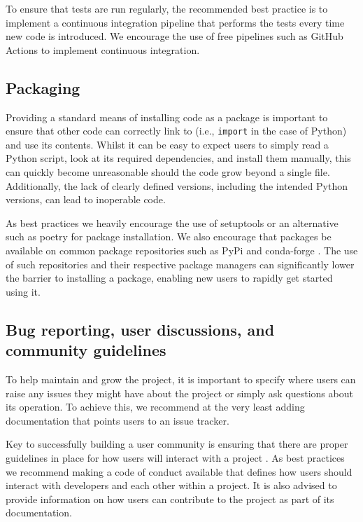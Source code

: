 \documentclass[9pt,whitepaper]{livecoms}
\begin{document}
To ensure that tests are run regularly, the recommended best practice is to implement a continuous integration pipeline that performs the tests every time new code is introduced. We encourage the use of free pipelines such as GitHub Actions \cite{github_inc_github_2022-2} to implement continuous integration.

\subsection{Packaging}
\label{sec:packaging}

Providing a standard means of installing code as a package is important to ensure that other code can correctly link to (i.e., \texttt{import} in the case of Python) and use its contents. Whilst it can be easy to expect users to simply read a Python script, look at its required dependencies, and install them manually, this can quickly become unreasonable should the code grow beyond a single file. Additionally, the lack of clearly defined versions, including the intended Python versions, can lead to inoperable code.

As best practices we heavily encourage the use of setuptools \cite{noauthor_pypasetuptools_2022} or an alternative such as poetry \cite{noauthor_poetry_nodate} for package installation. We also encourage that packages be available on common package repositories such as PyPi \cite{noauthor_pypi_nodate} and conda-forge \cite{conda-forge_community_conda-forge_2015}. The use of such repositories and their respective package managers can significantly lower the barrier to installing a package, enabling new users to rapidly get started using it.

\subsection{Bug reporting, user discussions, and community guidelines}
\label{sec:community}

To help maintain and grow the project, it is important to specify where users can raise any issues they might have about the project or simply ask questions about its operation. To achieve this, we recommend at the very least adding documentation that points users to an issue tracker.

Key to successfully building a user community is ensuring that there are proper guidelines in place for how users will interact with a project \cite{grossfield_how_2021}. As best practices we recommend making a code of conduct available that defines how users should interact with developers and each other within a project. It is also advised to provide information on how users can contribute to the project as part of its documentation.
\end{document}
